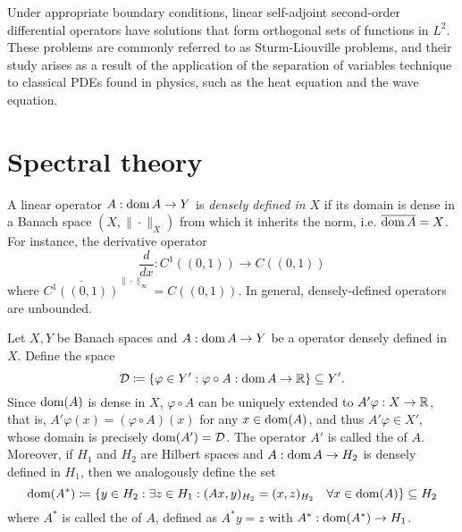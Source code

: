 Under appropriate boundary conditions, linear self-adjoint second-order differential operators have solutions that form orthogonal sets of functions in $L^2$. These problems are commonly referred to as Sturm-Liouville problems, and their study arises as a result of the application of the separation of variables technique to classical PDEs found in physics, such as the heat equation and the wave equation. 

\section{Spectral theory}\label{sec:spectral-theory}
\begin{definition}\label{def:densely-defined}
    A linear operator $A:\operatorname{\text{dom}} A \to Y$ is \textit{densely defined in $X$} if its domain is dense in a Banach space $(X,\|\cdot\|_X)$ from which it inherits the norm, i.e. $\overline{\operatorname{\text{dom}} A} = X$. For instance, the derivative operator 
    \begin{equation*}
        \frac{d}{dx}:C^1((0,1))\to C((0,1))
    \end{equation*}
    where $\overline{C^1((0,1))}^{\|\cdot\|_\infty} = C((0,1))$. In general, densely-defined operators are unbounded.
\end{definition}
\begin{definition}\label{def:transpose-adjoint}
    Let $X, Y$ be Banach spaces and $A:\operatorname{\text{dom}} A \to Y$ be a operator densely defined in $X$. Define the space
    \begin{equation}
        \mathcal{D}  \coloneqq  \{\varphi\in Y': \varphi\circ A:\operatorname{\text{dom}} A\to \mathbb{R} \}\subseteq Y'.
    \end{equation}
    Since $\operatorname{\text{dom}}(A)$ is dense in $X$, $\varphi\circ A$ can be uniquely extended to $A'\varphi:X\to \mathbb{R}$, that is, $A'\varphi(x) = (\varphi\circ A)(x)$ for any $x\in\operatorname{\text{dom}}(A)$, and thus $A'\varphi\in X'$, whose domain is precisely $\operatorname{\text{dom}}(A') = \mathcal{D}$. The operator $A'$ is called the  of $A$. Moreover, if $H_1$ and $H_2$ are Hilbert spaces and $A:\operatorname{\text{dom}} A\to H_2$ is densely defined in $H_1$, then we analogously define the set 
    \begin{equation}
        \operatorname{\text{dom}}(A^*)  \coloneqq  \{y\in H_2: \exists z\in H_1: (Ax,y)_{H_2} = (x,z)_{H_2}\quad \forall x\in\operatorname{\text{dom}}(A)\}\subseteq H_2
    \end{equation}
    where $A^*$ is called the  of $A$, defined as $A^*y = z$ with $A^*:\operatorname{\text{dom}}(A^*)\to H_1$.
\end{definition}
